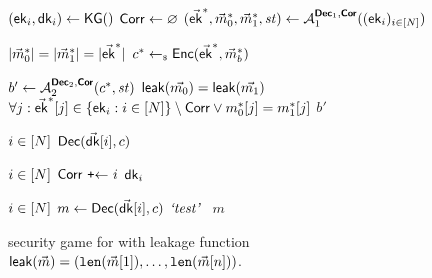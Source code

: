 \begin{figure}[!tbp]
  \begin{gamebox}{\mmindrcca}
    \begin{minipage}[t]{\linewidth}
      \begin{algorithmic}
        \For{$\idxUser\in[\nUsers]$}
           $(\mmpkepk_\idxUser, \mmpkesk_\idxUser)\gets \mmpkeKeyGen()$
        \EndFor
        \State $\term{Corr} \gets \emptyset$
        \State \mbox{$(\vec\mmpkepk^*,\vec m_0^*,\vec m_1^*,\mathit{st}) \gets \Adv[1]^{\oracle{Dec}_1, \oracle{Cor}}((\mmpkepk_i)_{i\in[\nUsers]})$}

        \State \KwReq{} $\abs{\vec m_0^*}=\abs{\vec m_1^*}=\abs{\vec\mmpkepk^*}$
        \State $c^* \getsr \mmpkeEnc(\vec\mmpkepk^*,\vec{m}_b^*)$

        \State $b' \gets \Adv[2]^{\oracle{Dec}_2, \oracle{Cor}}(c^*,\mathit{st})$
        \State \KwReq{} $\leak(\vec{m_0}) = \leak(\vec{m_1})$
        \State \KwReq{} $\forall j : \vec \mmpkepk^*[j] \in \{\mmpkepk_i : i\in[\nUsers]\} \setminus \term{Corr} \lor m_0^*[j]=m_1^*[j]$
        \State \Return $b'$
      \end{algorithmic}
    \end{minipage}

  \medskip
    \begin{minipage}[t]{.4\linewidth}
      \begin{algorithmic}
        \State \KwReq{} $\idxUser\in[\nUsers]$
        \State \Return $\mmpkeDec(\vec\mmpkesk[i],c)$
      \end{algorithmic}

      \medskip
      \begin{algorithmic}
        \State \KwReq{} $\idxUser\in[\nUsers]$
        \State $\term{Corr} \setadd \idxUser$
        \State \Return $\mmpkesk_\idxUser$
      \end{algorithmic}
    \end{minipage}\hfill\begin{minipage}[t]{.59\linewidth}
      \begin{algorithmic}
        \State \KwReq{} $\idxUser\in[\nUsers]$
        \State $m \gets \mmpkeDec(\vec\mmpkesk[i],c)$
        \State \Return $\literal{test}$
        \Else\
        \Return $m$
        \EndIf
      \end{algorithmic}
    \end{minipage}
  \end{gamebox}
  \caption{\mmindrcca security game for \mmPKE with leakage function  $\leak(\vec m) = (\len(\vec m[1]), \dots, \len(\vec m[n]))$.}
  \label{fig:mmpke_rcca}
\end{figure}

